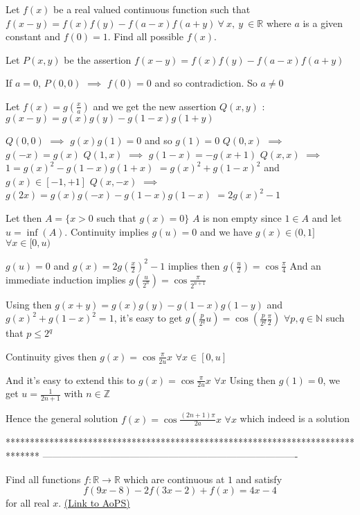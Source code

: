 \begin{solution}
	\begin{tcolorbox}Let $f(x)$ be a real valued continuous function such that $f(x-y)=f(x)f(y)-f(a-x)f(a+y)\ \forall\ x,\ y\ \in \mathbb{R}$ where $a$ is a given constant and $f(0)=1$. Find all possible $f(x).$\end{tcolorbox}
Let $P(x,y)$ be the assertion $f(x-y)=f(x)f(y)-f(a-x)f(a+y)$

If $a=0$, $P(0,0)$ $\implies$ $f(0)=0$ and so contradiction. So $a\ne 0$

Let $f(x)=g(\frac xa)$ and we get the new assertion $Q(x,y)$ : $g(x-y)=g(x)g(y)-g(1-x)g(1+y)$

$Q(0,0)$ $\implies$ $g(x)g(1)=0$ and so $g(1)=0$
$Q(0,x)$ $\implies$ $g(-x)=g(x)$
$Q(1,x)$ $\implies$ $g(1-x)=-g(x+1)$
$Q(x,x)$ $\implies$ $1=g(x)^2-g(1-x)g(1+x)$ $=g(x)^2+g(1-x)^2$ and $g(x)\in[-1,+1]$
$Q(x,-x)$ $\implies$ $g(2x)=g(x)g(-x)-g(1-x)g(1-x)$ $=2g(x)^2-1$

Let then $A=\{x>0$ such that $g(x)=0\}$ 
$A$ is non empty since $1\in A$ and let $u=\inf(A)$. Continuity implies $g(u)=0$ and we have $g(x)\in(0,1]$ $\forall x\in[0,u)$

$g(u)=0$ and $g(x)=2g(\frac x2)^2-1$ implies then $g(\frac u2)=\cos\frac{\pi}4$
And an immediate induction implies $g(\frac{u}{2^n})=\cos\frac{\pi}{2^{n+1}}$

Using then $g(x+y)=g(x)g(y)-g(1-x)g(1-y)$ and $g(x)^2+g(1-x)^2=1$, it's easy to get $g(\frac p{2^q}u)=\cos(\frac p{2^q}\frac{\pi}2)$ $\forall p,q\in\mathbb N$ such that $p\le 2^q$

Continuity gives then $g(x)=\cos\frac{\pi}{2u}x$ $\forall x\in[0,u]$

And it's easy to extend this to $g(x)=\cos\frac{\pi}{2u}x$ $\forall x$
Using then $g(1)=0$, we get $u=\frac 1{2n+1}$ with $n\in\mathbb Z$

Hence the general solution $\boxed{f(x)=\cos\frac{(2n+1)\pi}{2a}x}$ $\forall x$ which indeed is a solution
\end{solution}
*******************************************************************************
-------------------------------------------------------------------------------

\begin{problem}
	Find all functions $f: \mathbb{R}\to\mathbb{R}$ which are continuous at $1$ and satisfy \[f(9x-8)-2f(3x-2)+f(x)=4x-4\] for all real $x$.
	\flushright \href{https://artofproblemsolving.com/community/c6h391547}{(Link to AoPS)}
\end{problem}



